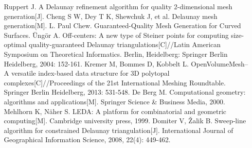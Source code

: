\documentclass[12pt, a4paper, openany, twoside]{book}
\begin{document}
\graphicspath{{FIGURES/}}

\frontmatter
{}


\tableofcontents
\cleardoublepage
\cleardoublepage

\mainmatter
\renewcommand{\thefootnote}{\arabic{footnote}}







\cleardoublepage


\wuhao


\begin{thebibliography}{99}
Ruppert J. A Delaunay refinement algorithm for quality 2-dimensional mesh generation[J].
Cheng S W, Dey T K, Shewchuk J, et al. Delaunay mesh generation[M].
L. Paul Chew. Guaranteed-Quality Mesh Generation for Curved Surfaces.
Üngör A. Off-centers: A new type of Steiner points for computing size-optimal quality-guaranteed Delaunay triangulations[C]//Latin American Symposium on Theoretical Informatics. Berlin, Heidelberg: Springer Berlin Heidelberg, 2004: 152-161.
Kremer M, Bommes D, Kobbelt L. OpenVolumeMesh–A versatile index-based data structure for 3D polytopal complexes[C]//Proceedings of the 21st International Meshing Roundtable. Springer Berlin Heidelberg, 2013: 531-548.
De Berg M. Computational geometry: algorithms and applications[M]. Springer Science \& Business Media, 2000.
Mehlhorn K, Näher S. LEDA: A platform for combinatorial and geometric computing[M]. Cambridge university press, 1999.
Domiter V, Žalik B. Sweep‐line algorithm for constrained Delaunay triangulation[J]. International Journal of Geographical Information Science, 2008, 22(4): 449-462.
\end{thebibliography}

\cleardoublepage



\cleardoublepage
\end{document}

